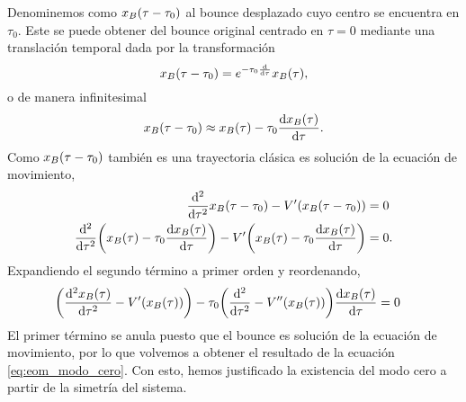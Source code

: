 \documentclass[11pt, a4paper]{article}
\numberwithin{equation}{section}
\theoremstyle{definition}
\begin{document}
Denominemos como $x_B \qty(\tau - \tau_0)$ al bounce desplazado cuyo centro se encuentra en $\tau_0$. Este se puede obtener del bounce original centrado en $\tau = 0$ mediante una translación temporal dada por la transformación
\begin{equation}
x_B \qty(\tau - \tau_0) = e^{-\tau_0 \dv{\tau}} x_B \qty(\tau),
\end{equation}
o de manera infinitesimal
\begin{equation} \label{eq:bounce_inf}
x_B \qty(\tau - \tau_0) \approx x_B \qty(\tau) - \tau_0 \dv{x_B \qty(\tau)}{\tau}.
\end{equation}
Como $x_B \qty(\tau - \tau_0)$ también es una trayectoria clásica es solución de la ecuación de movimiento,
\begin{align}
\dv[2]{\tau}x_B \qty(\tau - \tau_0) - V'(x_B \qty(\tau - \tau_0)) &= 0 \\
\dv[2]{\tau} \qty(x_B \qty(\tau) - \tau_0 \dv{x_B \qty(\tau)}{\tau}) - V'\qty(x_B \qty(\tau) - \tau_0 \dv{x_B \qty(\tau)}{\tau}) &= 0.
\end{align}
Expandiendo el segundo término a primer orden y reordenando,
\begin{align}
\qty(\dv[2]{x_B \qty(\tau)}{\tau} - V'\qty(x_B \qty(\tau))) - \tau_0 \qty(\dv[2]{\tau} - V''\qty(x_B \qty(\tau)))\dv{x_B \qty(\tau)}{\tau} &= 0 
\end{align}
El primer término se anula puesto que el bounce es solución de la ecuación de movimiento, por lo que volvemos a obtener el resultado de la ecuación \eqref{eq:eom_modo_cero}. Con esto, hemos justificado la existencia del modo cero a partir de la simetría del sistema. 
\end{document}

